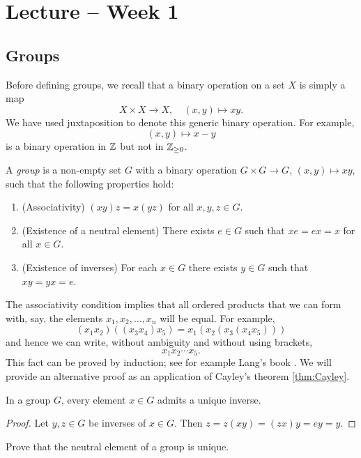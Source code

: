 \section{Lecture -- Week 1} 

\subsection{Groups}

Before defining groups, we recall that a binary operation on a set $X$
is simply a map 
\[
X\times X\to X,
\quad (x,y)\mapsto xy.
\]
We have used 
juxtaposition to denote this generic binary operation. For example,
\[
(x,y)\mapsto x-y
\]
is a binary operation in $\mathbb{Z}$ but not
in $\mathbb{Z}_{\geq 0}$.

\begin{definition}
A \emph{group} is a non-empty set $G$ with a binary operation
$G\times G\to G$, $(x,y)\mapsto xy$, such that
the following properties hold:
\begin{enumerate}
    \item (Associativity) $(xy)z=x(yz)$ for all $x,y,z\in G$.
    \item (Existence of a neutral element) There exists $e\in G$ such that $xe=ex=x$ for all $x\in G$.
    \item (Existence of inverses) For each $x\in G$ there exists $y\in G$ such that $xy=yx=e$.
\end{enumerate}
\end{definition}

The associativity condition implies
that all ordered products that we can form with, say, 
the elements $x_1,x_2,\dots,x_n$ will be equal. For example,
\[
(x_1x_2)((x_3x_4)x_5)=x_1(x_2(x_3(x_4x_5)))
\]
and hence we can write, without ambiguity and without using brackets, 
\[
x_1x_2\cdots x_5.
\]
This fact can be proved by induction; see for example
Lang's book \cite{MR783636}. We will provide an alternative proof as an application
of Cayley's theorem \ref{thm:Cayley}. 

\begin{proposition}
    In a group $G$, every element $x\in G$ admits a unique inverse.
\end{proposition}

\begin{proof}
    Let $y,z\in G$ be inverses of $x\in G$. Then 
    $z=z(xy)=(zx)y=ey=y$.
\end{proof}

\begin{exercise}
\label{xca:neutral}
    Prove that the neutral element of a group is unique. 
\end{exercise}

